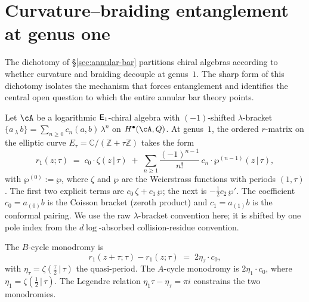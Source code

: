 \section{Curvature--braiding entanglement at genus one}
\label{sec:curvature-braiding-entanglement}

The dichotomy of \S\ref{sec:annular-bar} partitions chiral algebras
according to whether curvature and braiding decouple at genus~$1$.
The sharp form of this dichotomy isolates the mechanism
that forces entanglement and identifies the central open question
to which the entire annular bar theory points.

\begin{theorem}
\label{thm:elliptic-spectral-dichotomy}
Let $\cA$ be a logarithmic $\mathsf{E}_1$-chiral algebra with
$(-1)$-shifted $\lambda$-bracket
$\{a\,{}_\lambda\,b\}=\sum_{n\ge 0}c_n(a,b)\,\lambda^n$
on $H^\bullet(\cA,Q)$.
At genus~$1$, the ordered $r$-matrix on the elliptic curve
$E_\tau=\mathbb{C}/(\mathbb{Z}+\tau\mathbb{Z})$ takes the form
\begin{equation}\label{eq:elliptic-r-dichotomy}
r_1(z;\tau)
\;=\;
c_0\cdot\zeta(z\,|\,\tau)
\;+\;
\sum_{n\ge 1}
 \frac{(-1)^{n-1}}{n!}\,
 c_n\cdot\wp^{(n-1)}(z\,|\,\tau),
\end{equation}
with $\wp^{(0)}:=\wp$, where $\zeta$ and $\wp$ are the
Weierstrass functions with periods $(1,\tau)$. The first two
explicit terms are $c_0\,\zeta+c_1\,\wp$; the next is
$-\tfrac{1}{2}c_2\,\wp'$. The coefficient $c_0=a_{(0)}b$ is
the Coisson bracket \textup{(}zeroth product\textup{)} and
$c_1=a_{(1)}b$ is the conformal pairing. We use the raw
$\lambda$-bracket convention here; it is shifted by one pole index
from the $d\log$-absorbed collision-residue convention.

The $B$-cycle monodromy is
\begin{equation}\label{eq:b-cycle-monodromy-sharp}
r_1(z+\tau;\tau) - r_1(z;\tau) \;=\; 2\eta_\tau\cdot c_0,
\end{equation}
with $\eta_\tau=\zeta(\tfrac{\tau}{2}\,|\,\tau)$ the
quasi-period. The $A$-cycle monodromy is $2\eta_1\cdot c_0$,
where $\eta_1=\zeta(\tfrac{1}{2}\,|\,\tau)$. The Legendre
relation $\eta_1\tau-\eta_\tau=\pi i$ constrains the
two monodromies.
\end{theorem}

